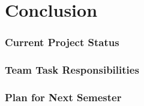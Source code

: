 \section{Conclusion}

\begin{frame}
\frametitle{Current Project Status}


\end{frame}

\begin{frame}
\frametitle{Team Task Responsibilities}


\end{frame}


\begin{frame}
\frametitle{Plan for Next Semester}


\end{frame}
